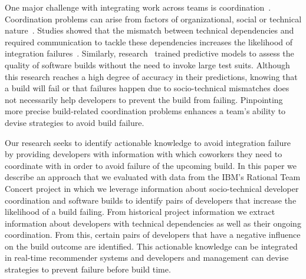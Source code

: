 \documentclass[conference]{IEEEtran}
\begin{document}
One major challenge with integrating work across teams is coordination~\cite{cataldo:esem:2008}.
Coordination problems can arise from factors of organizational,
social or technical nature~\cite{herbsleb:icse:1999}. Studies showed that the mismatch between technical dependencies and required communication to tackle these dependencies increases the likelihood of integration failures~\cite{kwan:tse:2011}. Similarly, research~\cite{wolf:icse:2009,hassan:ase:2006} trained predictive models to assess the quality of software builds without the need to invoke large test suits. Although this research
reaches a high degree of accuracy in their predictions, knowing that a
build will fail or that failures happen due to socio-technical mismatches does not necessarily help developers to prevent the build from failing. Pinpointing more precise build-related coordination problems enhances a team's ability to devise strategies to avoid build failure. 






Our research seeks to identify actionable knowledge to avoid integration failure by providing developers with information with which coworkers they need to coordinate with in order to avoid failure of the upcoming build. In this paper we describe an approach that we evaluated with data from the IBM's Rational Team Concert project in which we leverage
information about socio-technical developer coordination and software builds to
identify pairs of developers that increase the likelihood of a build failing. From historical project information we extract information about developers with technical dependencies
as well as their ongoing coordination. From this, certain pairs of developers that have a negative influence on the build outcome are identified. This
actionable knowledge can be integrated in real-time recommender systems and developers and management can
devise strategies to prevent failure before build time.
\end{document}

